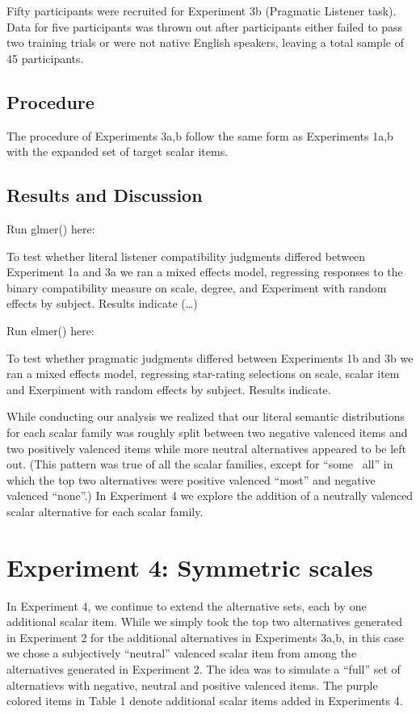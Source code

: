\documentclass[10pt, letterpaper]{article}
\begin{document}
Fifty participants were recruited for Experiment 3b (Pragmatic Listener
task). Data for five participants was thrown out after participants
either failed to pass two training trials or were not native English
speakers, leaving a total sample of 45 participants.

\subsection{Procedure}\label{procedure}

The procedure of Experiments 3a,b follow the same form as Experiments
1a,b with the expanded set of target scalar items.

\subsection{Results and Discussion}\label{results-and-discussion-2}

Run glmer() here:

To test whether literal listener compatibility judgments differed
between Experiment 1a and 3a we ran a mixed effects model, regressing
responses to the binary compatibility measure on scale, degree, and
Experiment with random effects by subject. Results indicate (\ldots{})

Run elmer() here:

To test whether pragmatic judgments differed between Experiments 1b and
3b we ran a mixed effects model, regressing star-rating selections on
scale, scalar item and Exerpiment with random effects by subject.
Results indicate.

While conducting our analysis we realized that our literal semantic
distributions for each scalar family was roughly split between two
negative valenced items and two positively valenced items while more
neutral alternatives appeared to be left out. (This pattern was true of
all the scalar families, except for ``some ~all'' in which the top two
alternatives were positive valenced ``most'' and negative valenced
``none''.) In Experiment 4 we explore the addition of a neutrally
valenced scalar alternative for each scalar family.

\section{Experiment 4: Symmetric
scales}\label{experiment-4-symmetric-scales}

In Experiment 4, we continue to extend the alternative sets, each by one
additional scalar item. While we simply took the top two alternatives
generated in Experiment 2 for the additional alternatives in Experiments
3a,b, in this case we chose a subjectively ``neutral'' valenced scalar
item from among the alternatives generated in Experiment 2. The idea was
to simulate a ``full'' set of alternatievs with negative, neutral and
positive valenced items. The purple colored items in Table 1 denote
additional scalar items added in Experiments 4.
\end{document}
